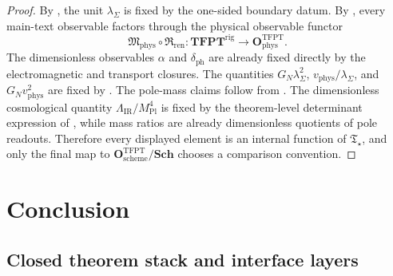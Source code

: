 \documentclass[11pt,a4paper]{article}
\theoremstyle{definition}
\theoremstyle{remark}
\newcommand{\Mplunred}{M_{\mathrm{Pl}}}
\newcommand{\Tstar}{\mathfrak T_{\star}}
\newcommand{\OphysTFPT}{\mathbf O_{\mathrm{phys}}^{\mathrm{TFPT}}}
\newcommand{\OschemeTFPT}{\mathbf O_{\mathrm{scheme}}^{\mathrm{TFPT}}}
\newcommand{\SchGrp}{\mathbf{Sch}}
\newcommand{\Mphys}{\mathfrak M_{\mathrm{phys}}}
\newcommand{\Rren}{\mathfrak R_{\mathrm{ren}}}
\begin{document}
\begin{proof}
By , the unit $\lambda_\Sigma$ is fixed by the one-sided
boundary datum. By , every main-text observable factors through
the physical observable functor
\[
\Mphys\circ\Rren:\mathbf{TFPT}^{\mathrm{rig}}\to\OphysTFPT.
\]
The dimensionless observables $\alpha$ and $\delta_{\mathrm{ph}}$ are already fixed directly by the
electromagnetic and transport closures. The quantities
$G_N\lambda_\Sigma^2$, $v_{\mathrm{phys}}/\lambda_\Sigma$, and
$G_Nv_{\mathrm{phys}}^2$ are fixed by
. The pole-mass
claims follow from . The dimensionless cosmological
quantity $\Lambda_{\mathrm{IR}}/\Mplunred^4$ is fixed by the theorem-level determinant expression of
, while mass ratios are already dimensionless quotients of pole
readouts. Therefore every displayed element is an internal function of $\Tstar$, and only the final
map to $\OschemeTFPT/\SchGrp$ chooses a comparison convention.
\end{proof}

\section{Conclusion}

\subsection{Closed theorem stack and interface layers}
\end{document}

